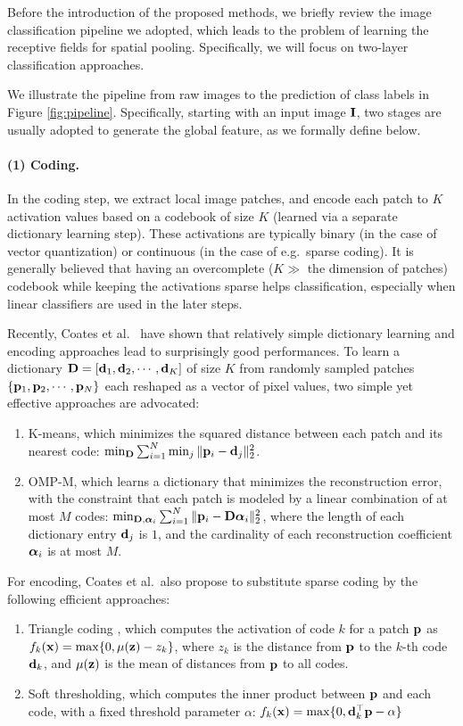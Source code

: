 Before the introduction of the proposed methods, we briefly review the image classification pipeline we adopted, which leads to the problem of learning the receptive fields for spatial pooling. Specifically, we will focus on two-layer classification approaches.

We illustrate the pipeline from raw images to the prediction of class labels in Figure \ref{fig:pipeline}. Specifically, starting with an input image $\mathbf{I}$, two stages are usually adopted to generate the global feature, as we formally define below.

\paragraph{(1) Coding.} In the coding step, we extract local image patches, and encode each patch to $K$ activation values based on a codebook of size $K$ (learned via a separate dictionary learning step). These activations are typically binary (in the case of vector quantization) or continuous (in the case of e.g.\ sparse coding). It is generally believed that having an overcomplete ($K \gg$ the dimension of patches) codebook while keeping the activations sparse helps classification, especially when linear classifiers are used in the later steps.

Recently, Coates et al.~\cite{Coates:2011ud} have shown that relatively simple dictionary learning and encoding approaches lead to surprisingly good performances. To learn a dictionary $\mathbf{D} =[\mathbf{d}_1,\mathbf{d}_2,\cdots,\mathbf{d}_K]$ of size $K$ from randomly sampled patches $\{\mathbf{p}_1,\mathbf{p}_2,\cdots,\mathbf{p}_N\}$ each reshaped as a vector of pixel values, two simple yet effective approaches are advocated:
\begin{enumerate}
  \item K-means, which minimizes the squared distance between each patch and its nearest code: $\min_{\mathbf{D}} \sum_{i=1}^{N}\min_{j}\|\mathbf{p}_i - \mathbf{d}_j\|_2^2$.
  \item OMP-M, which learns a dictionary that minimizes the reconstruction error, with the constraint that each patch is modeled by a linear combination of at most $M$ codes: $\min_{\mathbf{D},\boldsymbol{\alpha}_{i}} \sum_{i=1}^{N}\|\mathbf{p}_i-\mathbf{D}\boldsymbol{\alpha}_i\|^{2}_{2}$, where the length of each dictionary entry $\mathbf{d}_j$ is $1$, and the cardinality of each reconstruction coefficient $\boldsymbol{\alpha}_i$ is at most $M$.
\end{enumerate}
For encoding, Coates et al.\ also propose to substitute sparse coding by the following efficient approaches:
\begin{enumerate}
  \item Triangle coding \cite{Coates:wo}, which computes the activation of code $k$ for a patch $\mathbf{p}$ as $f_k(\mathbf{x}) = \max\{0,\mu(\mathbf{z}) - z_k\}$, where $z_k$ is the distance from $\mathbf{p}$ to the $k$-th code $\mathbf{d}_k$, and $\mu(\mathbf{z})$ is the mean of distances from $\mathbf{p}$ to all codes. 
  \item Soft thresholding, which computes the inner product between $\mathbf{p}$ and each code, with a fixed threshold parameter $\alpha$: $f_{k}(\mathbf{x}) = \max\{0, \mathbf{d}_k^\top\mathbf{p} - \alpha\}$
\end{enumerate}

